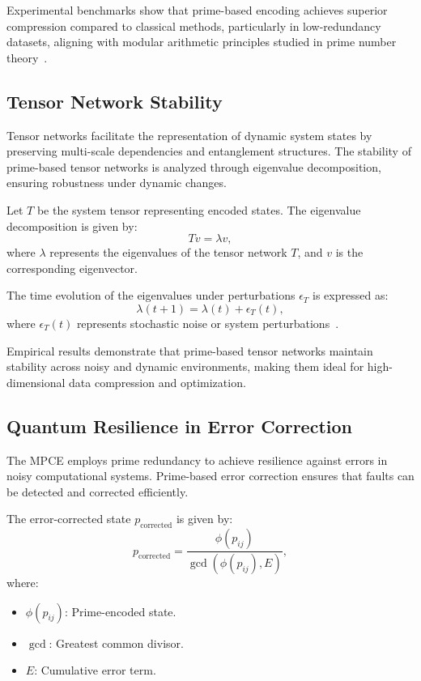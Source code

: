\documentclass{article}
\theoremstyle{plain}
\begin{document}
Experimental benchmarks show that prime-based encoding achieves superior compression compared to classical methods, particularly in low-redundancy datasets, aligning with modular arithmetic principles studied in prime number theory~\cite{hardy2008introduction, riemann1859hypothesis}.

\subsection{Tensor Network Stability}

Tensor networks facilitate the representation of dynamic system states by preserving multi-scale dependencies and entanglement structures. The stability of prime-based tensor networks is analyzed through eigenvalue decomposition, ensuring robustness under dynamic changes.

Let \( T \) be the system tensor representing encoded states. The eigenvalue decomposition is given by:
\begin{equation}
    T v = \lambda v,
\end{equation}
where \( \lambda \) represents the eigenvalues of the tensor network \( T \), and \( v \) is the corresponding eigenvector.

The time evolution of the eigenvalues under perturbations \( \epsilon_T \) is expressed as:
\begin{equation}
    \lambda(t+1) = \lambda(t) + \epsilon_T(t),
\end{equation}
where \( \epsilon_T(t) \) represents stochastic noise or system perturbations~\cite{vidal2003efficient, white1992tensor}.

Empirical results demonstrate that prime-based tensor networks maintain stability across noisy and dynamic environments, making them ideal for high-dimensional data compression and optimization.

\subsection{Quantum Resilience in Error Correction}

The MPCE employs prime redundancy to achieve resilience against errors in noisy computational systems. Prime-based error correction ensures that faults can be detected and corrected efficiently.

The error-corrected state \( p_{\text{corrected}} \) is given by:
\begin{equation}
    p_{\text{corrected}} = \frac{\phi(p_{ij})}{\gcd(\phi(p_{ij}), E)},
\end{equation}
where:
\begin{itemize}
    \item \( \phi(p_{ij}) \): Prime-encoded state.
    \item \( \gcd \): Greatest common divisor.
    \item \( E \): Cumulative error term.
\end{itemize}
\end{document}
